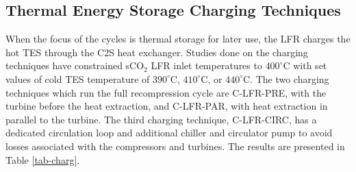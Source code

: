 \begin{paracol}{2}
\subsection{Thermal Energy Storage Charging Techniques}

When the focus of the cycles is thermal storage for later use, the LFR charges the hot TES through the C2S heat exchanger. Studies done on the charging techniques have constrained sCO$_2$ LFR inlet temperatures to $400^{\circ}$C with set values of cold TES temperature of $390^{\circ}$C, $410^{\circ}$C, or $440^{\circ}$C. The two charging techniques which run the full recompression cycle are C-LFR-PRE, with the turbine before the heat extraction, and C-LFR-PAR, with heat extraction in parallel to the turbine. The third charging technique, C-LFR-CIRC, has a dedicated circulation loop and additional chiller and circulator pump to avoid losses associated with the compressors and turbines. The results are presented in Table \ref{tab-charg}.  

\end{paracol}
